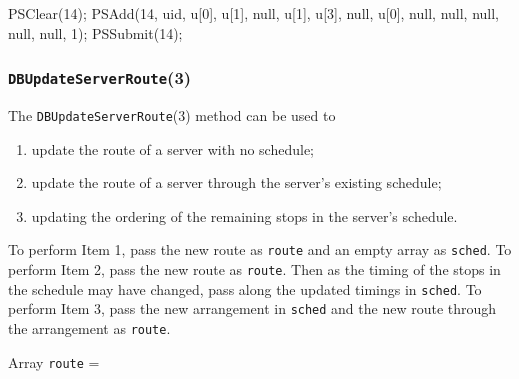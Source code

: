 \documentclass{article}
\def\nwendcode{\endtrivlist \endgroup}
\let\nwdocspar=\par
\theoremstyle{definition}
\begin{document}
\nwenddocs{}\endmoddef{}
PSClear(14);
PSAdd(14, uid, u[0], u[1], null, u[1], u[3], null, u[0],
    null, null, null, null, null, 1);
PSSubmit(14);
\nwendcode{}\nwdocspar

\subsubsection{{\tt{}\protect{}DBUpdateServerRoute}(3)}
The {\tt{}\protect{}DBUpdateServerRoute}(3) method can be used to
\begin{enumerate}
\item update the route of a server with no schedule;
\item update the route of a server through the server's existing schedule;
\item updating the ordering of the remaining stops in the server's schedule.
\end{enumerate}
To perform Item 1, pass the new route as {\tt{}route} and an empty array as
{\tt{}sched}. To perform Item 2, pass the new route as {\tt{}route}. Then as the
timing of the stops in the schedule may have changed, pass along the updated
timings in {\tt{}sched}. To perform Item 3, pass the new arrangement in {\tt{}sched}
and the new route through the arrangement as {\tt{}route}.

Array {\tt{}route} =

\noindent
{}
\end{document}
